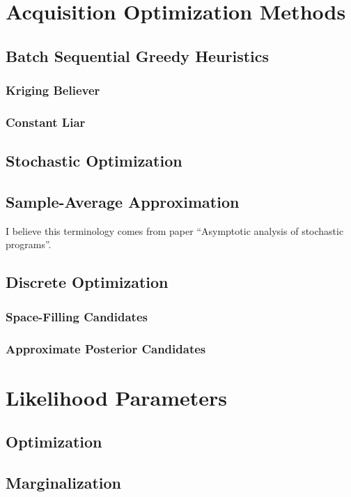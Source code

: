 \documentclass[12pt]{article}
\begin{document}
\section{Acquisition Optimization Methods}
\subsection{Batch Sequential Greedy Heuristics}
\subsubsection{Kriging Believer}
\subsubsection{Constant Liar}
\subsection{Stochastic Optimization}
\subsection{Sample-Average Approximation}
I believe this terminology comes from paper ``Asymptotic analysis of stochastic programs''. 
\subsection{Discrete Optimization}
\subsubsection{Space-Filling Candidates}
\subsubsection{Approximate Posterior Candidates}

\section{Likelihood Parameters}
\subsection{Optimization}
\subsection{Marginalization}
\end{document}
